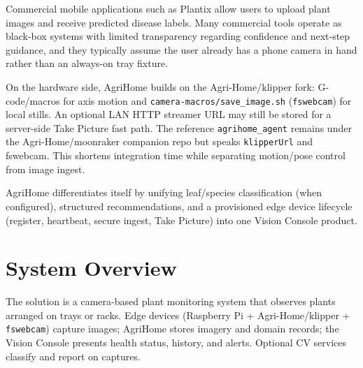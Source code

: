 \documentclass[11pt,letterpaper]{article}
\begin{document}
Commercial mobile applications such as Plantix allow users to upload plant images and receive
predicted disease labels. Many commercial tools operate as black-box systems with limited
transparency regarding confidence and next-step guidance, and they typically assume the user already
has a phone camera in hand rather than an always-on tray fixture.

On the hardware side, AgriHome builds on the Agri-Home/klipper fork: G-code/macros for axis motion
and \texttt{camera-macros/save\_image.sh} (\texttt{fswebcam}) for local stills. An optional LAN HTTP
streamer URL may still be stored for a server-side Take Picture fast path. The reference
\texttt{agrihome\_agent} remains under the Agri-Home/moonraker companion repo but speaks
\texttt{klipperUrl} and fswebcam. This shortens integration time while separating motion/pose control
from image ingest.

AgriHome differentiates itself by unifying leaf/species classification (when configured), structured
recommendations, and a provisioned edge device lifecycle (register, heartbeat, secure ingest, Take
Picture) into one Vision Console product.

\section{System Overview}
The solution is a camera-based plant monitoring system that observes plants arranged on trays or
racks. Edge devices (Raspberry Pi + Agri-Home/klipper + \texttt{fswebcam}) capture images; AgriHome stores imagery and
domain records; the Vision Console presents health status, history, and alerts. Optional CV services
classify and report on captures.
\end{document}
